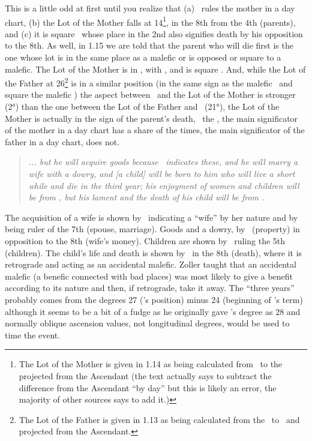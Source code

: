 This is a little odd at first until you realize that (a) \Venus\, rules the mother in a day chart, (b) the Lot of the Mother falls at 14\Virgo\footnote{The Lot of the Mother is given in 1.14 as being calculated from \Venus\, to the \Moon\, projected from the Ascendant (the text actually says to subtract the difference from the Ascendant ``by day'' but this is likely an error, the majority of other sources says to add it.)}, in the 8th from the 4th (parents), and (c) it is square \Saturn\, whose place in the 2nd also signifies death by his opposition to the 8th. As well, in 1.15 we are told that the parent who will die first is the one whose lot is in the same place as a malefic or is opposed or square to a malefic. The Lot of the Mother is in \Virgo, with \Mars, and is square \Saturn. And, while the Lot of the Father at 26\Sagittarius\footnote{The Lot of the Father is given in 1.13 as being calculated from the \Sun\, to \Saturn\, and projected from the Ascendant.} is in a similar position (in the same sign as the malefic \Saturn\, and square the malefic \Mars) the aspect between \Saturn\, and the Lot of the Mother is stronger (2°) than the one between the Lot of the Father and \Mars\, (21°), the Lot of the Mother is actually in the sign of the parent's death, \Venus\, the \Sun, the main significator of the mother in a day chart has a share of the times, the main significator of the father in a day chart, does not.

\begin{quote}
\textsl{... but he will acquire goods because \Saturn\, indicates these, and he will marry a wife with a dowry, and [a child] will be born to him who will live a short while and die in the third year; his enjoyment of women and children will be from \Venus, but his lament and the death of his child will be from \Saturn.}
\end{quote}

The acquisition of a wife is shown by \Venus\, indicating a ``wife'' by her nature and by being ruler of the 7th (spouse, marriage). Goods and a dowry, by \Saturn\, (property) in opposition to the 8th (wife's money). Children are shown by \Jupiter\, ruling the 5th (children). The child's life and death is shown by \Jupiter\, in the 8th (death), where it is retrograde and acting as an accidental malefic. Zoller taught that an accidental malefic (a benefic connected with bad places) was most likely to give a benefit according to its nature and then, if retrograde, take it away. The ``three years'' probably comes from the degrees 27 (\Venus's position) minus 24 (beginning of \Saturn's term) although it seems to be a bit of a fudge as he originally gave \Venus's degree as 28 and normally oblique ascension values, not longitudinal degrees, would be used to time the event.

